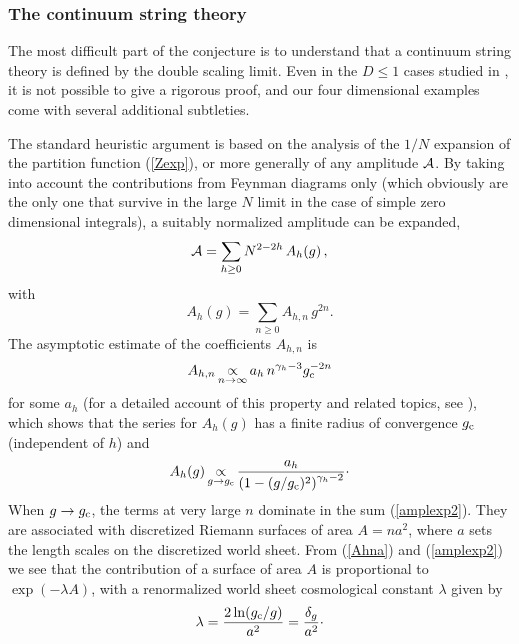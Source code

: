 \documentclass[a4paper,12pt]{article}
\begin{document}
{\subsubsection{The continuum string theory}
%
The most difficult part of the conjecture is to understand that
a continuum string theory is defined by the 
double scaling limit. Even in the $D\leq 1$ cases studied in
\cite{BK,review}, it is not possible to give a rigorous proof, and our four 
dimensional examples come with several additional subtleties. 

The standard heuristic argument is based on the analysis of the 
$1/N$ expansion of the partition function (\ref{Zexp}), or more 
generally of any amplitude $\cal A$. By taking into account
the contributions from Feynman diagrams only (which obviously are the only 
one that survive in the large $N$ limit in the case of simple zero
dimensional integrals), a suitably normalized amplitude can be expanded,
%
\begin{equation}
\label{amplexp}
{\cal A} = \sum_{h\geq 0} N^{2-2h}\, A_{h}(g)\, ,
\end{equation}
%
with
%
\begin{equation}
\label{amplexp2}
A_{h}(g) = \sum_{n\geq 0}A_{h,n}\, g^{2n}.
\end{equation}
%
The asymptotic estimate of the coefficients $A_{h,n}$ is 
%
\begin{equation}
\label{Ahna}
A_{h,n} \mathop{\propto}\limits _{n\rightarrow\infty} a_{h}\, 
n^{\gamma_{h}-3} g_{\rm c}^{-2n}
\end{equation}
%
for some $a_h$ (for a detailed account of this property and related topics,
see \cite{bes}),
which shows that the series for $A_{h}(g)$ has a finite radius of 
convergence $g_{\rm c}$ (independent of $h$) and
%
\begin{equation}
\label{Ahlim}
A_{h}(g) \mathop{\propto}\limits _{g\rightarrow g_{\rm c}} {a_h\over 
\left(1-(g/g_{\rm c})^2\right)^{\gamma_{h}-2}}\cdotp
\end{equation}
%
When $g\rightarrow g_{\rm c}$, the terms at very large $n$ dominate in the 
sum (\ref{amplexp2}). They are associated with discretized Riemann surfaces of 
area $A=n a^{2}$, where $a$ sets the length scales on the discretized 
world sheet. From (\ref{Ahna}) and (\ref{amplexp2}) 
we see that the contribution of a surface of area $A$ is 
proportional to $\exp (-\lambda A)$, with a renormalized world sheet
cosmological constant $\lambda$ given by
%
\begin{equation}
\label{wscc}
\lambda = { 2\ln (\gc /g)\over a^{2}} = {\delta_g\over a^{2}}\cdotp

\end{equation}}
\end{document}
